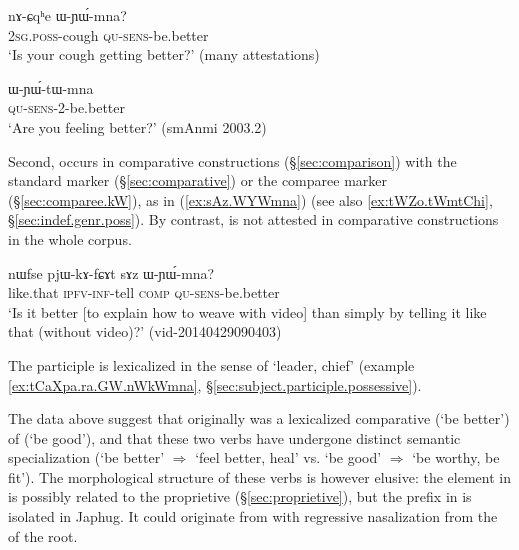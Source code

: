 \begin{exe}
\ex \label{ex:nACqhe.WYWmna}
\gll nɤ-ɕqʰe ɯ-ɲɯ́-mna? \\
\textsc{2sg}.\textsc{poss}-cough \textsc{qu}-\textsc{sens}-be.better \\
\glt `Is your cough getting better?' (many attestations)
\end{exe}

\begin{exe}
\ex \label{ex:WYWtWmna}
\gll ɯ-ɲɯ́-tɯ-mna \\
\textsc{qu}-\textsc{sens}-2-be.better \\
\glt `Are you feeling better?' (smAnmi 2003.2)
\end{exe}

Second,  occurs in comparative constructions (§\ref{sec:comparison}) with the standard marker  (§\ref{sec:comparative}) or the comparee marker  (§\ref{sec:comparee.kW}), as in (\ref{ex:sAz.WYWmna}) (see also \ref{ex:tWZo.tWmtChi}, §\ref{sec:indef.genr.poss}). By contrast,  is not attested in comparative constructions in the whole corpus.

\begin{exe}
\ex \label{ex:sAz.WYWmna}
\gll  nɯfse pjɯ-kɤ-fɕɤt sɤz ɯ-ɲɯ́-mna? \\
like.that \textsc{ipfv}-\textsc{inf}-tell \textsc{comp} \textsc{qu}-\textsc{sens}-be.better \\
\glt `Is it better [to explain how to weave with video] than simply by telling it like that (without video)?' (vid-20140429090403) 
\end{exe}

The participle  is lexicalized in the sense of `leader, chief' (example \ref{ex:tCaXpa.ra.GW.nWkWmna}, §\ref{sec:subject.participle.possessive}).

The data above suggest that  originally was a lexicalized comparative (`be better') of  (`be good'), and that these two verbs have undergone distinct semantic specialization (`be better' $\Rightarrow$ `feel better, heal' vs. `be good' $\Rightarrow$ `be worthy, be fit'). The morphological structure of these verbs is however elusive: the  element in  is possibly related to the proprietive  (§\ref{sec:proprietive}), but the  prefix in  is isolated in Japhug. It could originate from  with regressive nasalization from the  of the root.


